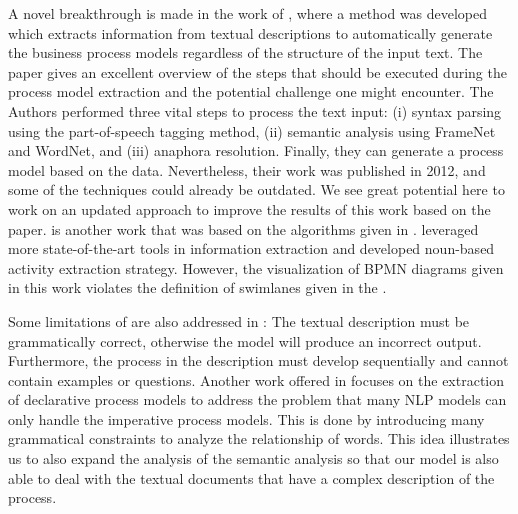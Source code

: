 	A novel breakthrough is made in the work of \cite{t2m_1}, where a method was developed which extracts information from textual descriptions to automatically generate the business process models regardless of the structure of the input text. The paper gives an excellent overview of the steps that should be executed during the process model extraction and the potential challenge one might encounter. The Authors performed three vital steps to process the text input: (i) syntax parsing using the part-of-speech tagging method, (ii) semantic analysis using FrameNet and WordNet, and (iii) anaphora resolution. Finally, they can generate a process model based on the data. Nevertheless, their work was published in 2012, and some of the techniques could already be outdated. We see great potential here to work on an updated approach to improve the results of this work based on the paper. \cite{t2m_1_successor} is another work that was based on the algorithms given in \cite{t2m_1}. \cite{t2m_1_successor} leveraged more state-of-the-art tools in information extraction and developed noun-based activity extraction strategy. However, the visualization of BPMN diagrams given in this work violates the definition of swimlanes given in the \cite{BPMN_tech_report}.
	
	 Some limitations of \cite{t2m_1} are also addressed in \cite{pre_processing_1}: The textual description must be grammatically correct, otherwise the model will produce an incorrect output. Furthermore, the process in the description must develop sequentially and cannot contain examples or questions. Another work offered in \cite{t2m_2} focuses on the extraction of declarative process models to address the problem that many NLP models can only handle the imperative process models. This is done by introducing many grammatical constraints to analyze the relationship of words. This idea illustrates us to also expand the analysis of the semantic analysis so that our model is also able to deal with the textual documents that have a complex description of the process. 
	 
